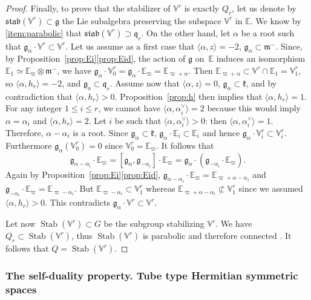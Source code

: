 \documentclass[10pt]{amsart}
\let\oldvee\vee
\renewcommand{\vee}{{\scriptscriptstyle\oldvee}}
\newcommand{\citestar}[3]{\cite[#3]{#1}}
\theoremstyle{plain}
\theoremstyle{definition}
\let\rgy r
\DeclareMathOperator{\Stab}{Stab}
\newcommand{\bE}{\mathbb{E}}
\newcommand{\Vr}{\mathbb{V}^\rgy}
\newcommand{\fgg}{\mathfrak{g}}
\newcommand{\fk}{\mathfrak{k}}
\newcommand{\fm}{\mathfrak{m}}
\newcommand{\fq}{\mathfrak{q}}
\newcommand{\fstab}{\mathfrak{stab}}
\newcommand{\scal}[1]{\langle #1 \rangle}
\begin{document}
\begin{proof}
Finally, to prove that the stabilizer of $\Vr$ is exactly $Q_\rgy$, let us denote by
\hbox{$\fstab(\Vr)\!\subset\!\fgg$} the Lie subalgebra
preserving the subspace $\Vr$ in $\bE$.
We know by \eqref{item:parabolic} that \hbox{$\fstab(\Vr)\!\supset\!\fq_\rgy$}.
On the other hand, let $\alpha$ be a root
such that $\fgg_\alpha \cdot \Vr \subset \Vr$.
Let us assume as a first case that $\scal{\alpha,z}=-2$, \ie $\fgg_\alpha\subset\fm^-$. Since, by
Proposition~\ref{prop:Ei}\eqref{prop:Eid}, the action of $\fgg$ on~$\bE$ induces
an isomorphism $\bE_1 \simeq \bE_\varpi \otimes \fm^-$, we have $\fgg_\alpha \cdot \Vr_0=\fgg_\alpha \cdot \bE_{\varpi} = \bE_{\varpi+\alpha}$.
Then $\bE_{\varpi+\alpha} \subset \Vr\cap\bE_1=\Vr_1$, so $\scal{\alpha,h_\rgy}=-2$, and $\fgg_a\subset\fq_\rgy$.
Assume now that $\scal{\alpha,z}=0$, \ie $\fgg_\alpha\subset\fk$, and by contradiction that $\scal{\alpha,h_\rgy}>0$.
Proposition~\ref{prop:h} then implies that $\scal{\alpha,h_\rgy}=1$.
For any integer $1\leq i\leq r$,
we cannot have $\scal{\alpha,\alpha_i^\vee}=2$ because this would imply $\alpha=\alpha_i$ and
$\scal{\alpha,h_\rgy}=2$. Let $i$ be such that $\scal{\alpha,\alpha_i^\vee}>0$: then
$\scal{\alpha,\alpha_i^\vee}=1$. Therefore, $\alpha-\alpha_i$ is a root.
Since $\fgg_\alpha\subset\fk$, $\fgg_\alpha\cdot \bE_i\subset\bE_i$ and hence
$\fgg_\alpha\cdot\Vr_i\subset\Vr_i$. Furthermore $\fgg_\alpha(\Vr_0)=0$ since $\Vr_0=\bE_\varpi$.
It follows that
$$
\fgg_{\alpha-\alpha_i} \cdot \bE_{\varpi} = [ \fgg_\alpha, \fgg_{-\alpha_i} ] \cdot \bE_{\varpi}
= \fgg_\alpha \cdot (\fgg_{-\alpha_i} \cdot \bE_{\varpi}).
$$
Again by Proposition~\ref{prop:Ei}\eqref{prop:Eid}, $\fgg_{\alpha-\alpha_i} \cdot \bE_{\varpi} = \bE_{\varpi + \alpha -
\alpha_i}$ and $\fgg_{-\alpha_i}\cdot\bE_\varpi= \bE_{\varpi-\alpha_i}$. But $\bE_{\varpi-\alpha_i}\subset \Vr_1$
whereas $\bE_{\varpi + \alpha - \alpha_i}\not\subset\Vr_1$ since we assumed $\scal{\alpha,h_\rgy}>0$.
This contradicts $\fgg_\alpha \cdot \Vr \subset \Vr$.

Let now $\Stab(\Vr) \subset G$ be the subgroup stabilizing $\Vr$. We have $Q_\rgy \subset \Stab
(\Vr)$, thus $\Stab(\Vr)$ is parabolic and therefore connected \citestar{humphreys}*{Cor.\,23.1.B}. It
follows that $Q=\Stab(\Vr)$.
\end{proof}

\subsubsection{The self-duality property. Tube type Hermitian symmetric spaces}
\label{subsubsec:tube}
\end{document}
